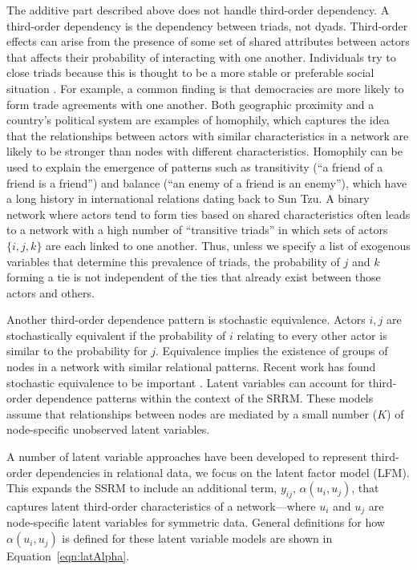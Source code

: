 \documentclass[12pt]{amsart}
\begin{document}
The additive part described above does not handle third-order dependency. A third-order dependency is the dependency between triads, not dyads. Third-order effects can arise from the presence of some set of shared attributes between actors that affects their probability of interacting with one another. Individuals try to close triads because this is thought to be a more stable or preferable social situation \citep{wasserman:faust:1994,zinnes:1967}.
For example, a common finding is that democracies are more likely to form trade agreements with one another. Both geographic proximity and a country's political system are examples of homophily, which captures the idea that the relationships between actors with similar characteristics in a network are likely to be stronger than nodes with different characteristics. Homophily can be used to explain the emergence of patterns such as transitivity (``a friend of a friend is a friend'') and balance (``an enemy of a friend is an enemy''), which have a long history in international relations dating back to Sun Tzu. A binary network where actors tend to form ties based on shared characteristics  often leads to a network with a high number of ``transitive triads'' in which  sets of actors $\{i,j,k\}$ are each linked to one another. Thus, unless we specify a list of exogenous variables that determine this prevalence of triads, the probability of $j$ and $k$ forming a tie is not independent of the ties that already exist between those actors and others.

Another third-order dependence pattern is stochastic equivalence. Actors $i,j$ are stochastically equivalent if the probability of $i$ relating to every other actor is similar to the probability for $j$. Equivalence implies the existence of groups of nodes in a network with similar relational patterns.  Recent work has found stochastic equivalence to be important \citep{manger:etal:2012}. Latent variables can account for third-order dependence patterns within the context of the SRRM. These models assume that relationships between nodes are mediated by a small number ($K$) of node-specific unobserved latent variables. 

A number of latent variable approaches have been developed to represent third-order dependencies in relational data, we focus on the latent factor model (LFM). This expands the SSRM to include an additional term, $y_{ij}$, $\alpha(u_{i}, u_{j})$, that captures latent third-order characteristics of a network---where $u_{i}$ and $u_{j}$ are node-specific latent variables for symmetric data. General definitions for how $\alpha(u_{i}, u_{j})$ is defined for these latent variable models are shown in Equation~\ref{eqn:latAlpha}. 
\end{document}
